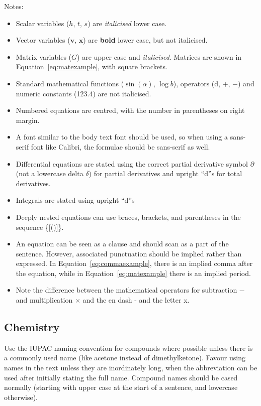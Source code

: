 \documentclass[a5paper, 10pt]{article}
\begin{document}
Notes:
\begin{itemize}
\item Scalar variables ($h$, $t$, $s$) are \emph{italicised} lower case.
\item Vector variables ($\mathbf{v}$, $\mathbf{x}$) are \textbf{bold}
  lower case, but not italicised.
\item Matrix variables ($G$) are upper case and \emph{italicised}.
  Matrices are shown in Equation~\ref{eq:matexample}, with
  square brackets.
\item Standard mathematical functions ($\sin(\alpha)$, $\log b$), operators (d,
  $+$, $-$) and
  numeric constants (\num{123.4}) are not italicised.
\item Numbered equations are centred, with the number in parentheses on
  right margin.
\item A font similar to the body text font should be used, so when
  using a sans-serif font like Calibri, the formulae should be
  sans-serif as well.
\item Differential equations are stated using the correct partial
  derivative symbol $\partial$ (not a lowercase delta $\delta$) for
  partial derivatives and upright ``d''s  for total derivatives.
\item Integrals are stated using upright ``d''s
\item Deeply nested equations can use braces, brackets, and parentheses in the
  sequence \{[()]\}.
\item An equation can be seen as a clause and should scan as a part of
  the sentence.  However, associated punctuation should be implied
  rather than expressed.  In Equation~\ref{eq:commaexample}, there is
  an implied comma after the equation, while in
  Equation~\ref{eq:matexample} there is an implied period.
\item Note the difference between the mathematical operators for subtraction $-$ and multiplication $\times$ and the en dash - and the letter x. 
\end{itemize}

\subsection{Chemistry}
Use the IUPAC naming convention for compounds where possible unless
there is a commonly used name (like acetone instead of
dimethylketone).  Favour using names in the text unless they are
inordinately long, when the abbreviation can be used after initially
stating the full name.  Compound names should be cased normally
(starting with upper case at the start of a sentence, and lowercase
otherwise).
\end{document}
